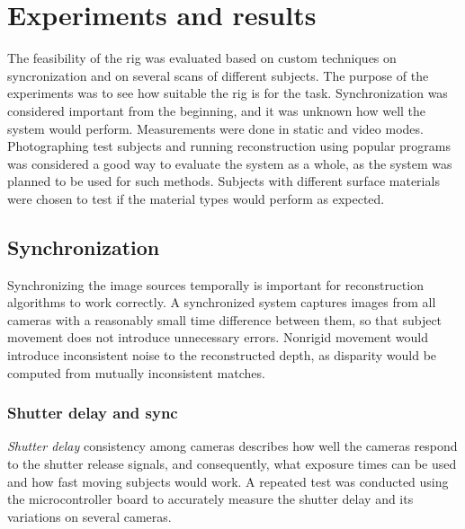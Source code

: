 \section{Experiments and results} \label{sec:experiments}

The feasibility of the rig was evaluated based on custom techniques on syncronization and on several scans of different subjects.
The purpose of the experiments was to see how suitable the rig is for the task.
Synchronization was considered important from the beginning, and it was unknown how well the system would perform.
Measurements were done in static and video modes.
Photographing test subjects and running reconstruction using popular programs was considered a good way to evaluate the system as a whole, as the system was planned to be used for such methods.
Subjects with different surface materials were chosen to test if the material types would perform as expected.

\subsection{Synchronization}

Synchronizing the image sources temporally is important for reconstruction algorithms to work correctly.
A synchronized system captures images from all cameras with a reasonably small time difference between them, so that subject movement does not introduce unnecessary errors.
Nonrigid movement would introduce inconsistent noise to the reconstructed depth, as disparity would be computed from mutually inconsistent matches.

\subsubsection{Shutter delay and sync} \label{sec:shutterdelaymeas}

\emph{Shutter delay} consistency among cameras describes how well the cameras respond to the shutter release signals, and consequently, what exposure times can be used and how fast moving subjects would work.
A repeated test was conducted using the microcontroller board to accurately measure the shutter delay and its variations on several cameras.


